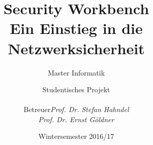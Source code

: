 

\title{Security Workbench\\ Ein Einstieg in die Netzwerksicherheit}
\subtitle{Master Informatik}
\subject{DOKUMENTATION}

\author{Studentisches Projekt \\[0.5cm]
\begin{tabular}{rl}
Betreuer & \emph{Prof. Dr. Stefan Hahndel}\\
 & \emph{Prof. Dr. Ernst Göldner}
\end{tabular}
}

\date{Wintersemester 2016/17}



\tableofcontents
\clearpage
\listoffigures
\clearpage
















